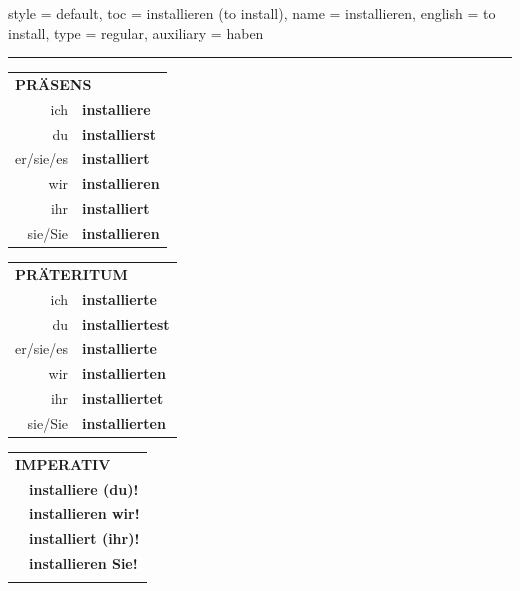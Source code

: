 \begin{verbentry}{
  style = {default},
  toc = {installieren (to install)},
  name = {installieren},
  english = {to install},
  type = {regular},
  auxiliary = {haben}
}
 
    
     \vspace{5pt}

    \hrule
    
    \vspace{5pt}

  \begin{tabular}{rl}
     \multicolumn{2}{l}{\textbf{PRÄSENS} }\\
    ich & \textbf{installiere}\\
    du & \textbf{installierst}\\
    er/sie/es & \textbf{installiert}\\
    wir & \textbf{installieren}\\
    ihr & \textbf{installiert}\\
    sie/Sie & \textbf{installieren}\\
  \end{tabular}
  \hfill
  \begin{tabular}{rl}
    \multicolumn{2}{l}{\textbf{PRÄTERITUM} }\\
    ich & \textbf{installierte}\\
    du & \textbf{installiertest}\\
    er/sie/es & \textbf{installierte}\\
    wir & \textbf{installierten}\\
    ihr & \textbf{installiertet}\\
    sie/Sie & \textbf{installierten}\\
  \end{tabular}
  \hfill
  \begin{tabular}{rl}
     \multicolumn{2}{l}{\textbf{IMPERATIV} }\\
   & \textbf{installiere (du)!}\\
   & \textbf{installieren wir!}\\
   & \textbf{installiert (ihr)!}\\
   & \textbf{installieren Sie!}\\
   & \vspace{10pt}
  \end{tabular}

 \vspace{10pt}


\end{verbentry}
